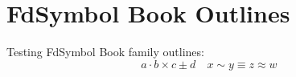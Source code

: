 \documentclass{article}
\begin{document}
\section{FdSymbol Book Outlines}

Testing FdSymbol Book family outlines:
\[
  a \cdot b \times c \pm d \quad x \sim y \equiv z \approx w
\]
\end{document}
